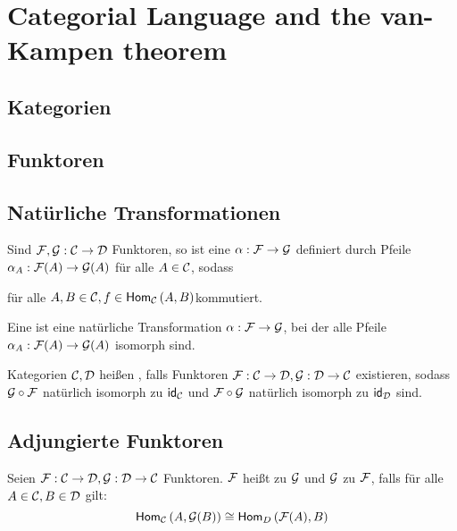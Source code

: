 \newcommand{\triag}[6]{
\begin{tikzpicture}
\node (D1) at (0,2) [] {$#1$};
\node (D3) at (2,2) [] {$#3$};
\node (D5) at (1,0) [] {$#5$};

\draw [->] (D1) -> (D3) node[midway, above] {$#2$};
\draw [->] (D3) -> (D5) node[midway, below right] {$#4$};
\draw [->] (D1) -> (D5) node[midway, below left] {$#6$};

\end{tikzpicture}
}



\chapter{Categorial Language and the van-Kampen theorem}
\section{Kategorien}
\section{Funktoren}
\section{Natürliche Transformationen}
Sind $\mathcal{F}, \mathcal{G} : \mathcal{C} \rightarrow \mathcal{D}$ Funktoren, so ist eine  $\alpha : \mathcal{F} \rightarrow \mathcal{G}$ definiert durch Pfeile $\alpha_A : \mathcal{F}(A) \rightarrow \mathcal{G}(A)$ für alle $A \in \mathcal{C}$, sodass
\begin{center}
\end{center}
für alle $A, B \in \mathcal{C}, f \in \textsf{Hom}_{\mathcal{C}}\left(A, B\right)$kommutiert.

Eine  ist eine natürliche Transformation $\alpha : \mathcal{F} \rightarrow \mathcal{G}$, bei der alle Pfeile $\alpha_A : \mathcal{F}(A) \rightarrow \mathcal{G}(A)$ isomorph sind.


Kategorien $\mathcal{C},\mathcal{D}$ heißen , falls Funktoren $\mathcal{F} : \mathcal{C} \rightarrow \mathcal{D}, \mathcal{G} : \mathcal{D}\rightarrow \mathcal{C}$ existieren, sodass $\mathcal{G}\circ \mathcal{F}$ natürlich isomorph zu $\textsf{id}_{\mathcal{C}}$ und $\mathcal{F}\circ \mathcal{G}$ natürlich isomorph zu $\textsf{id}_{\mathcal{D}}$ sind.

\section{Adjungierte Funktoren}
Seien $\mathcal{F} : \mathcal{C} \rightarrow \mathcal{D}, \mathcal{G} : \mathcal{D} \rightarrow \mathcal{C}$ Funktoren. $\mathcal{F}$ heißt  zu $\mathcal{G}$ und $\mathcal{G}$  zu $\mathcal{F}$, falls für alle $A \in \mathcal{C}, B \in \mathcal{D}$ gilt:
\[\textsf{Hom}_{\mathcal{C}}\left(A, \mathcal{G}(B)\right) \cong \textsf{Hom}_{D}\left(\mathcal{F}(A), B\right) \]

